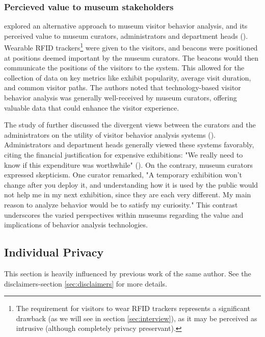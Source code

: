 \subsubsection{Percieved value to museum stakeholders}
\citeauthor{la2017museumbehaviouranalysis} explored an alternative approach to museum visitor behavior analysis, and its perceived value to museum curators, administrators and department heads (\citeyear{la2017museumbehaviouranalysis}). Wearable RFID trackers\footnote{The requirement for visitors to wear RFID trackers represents a significant drawback (as we will see in section \ref{sec:interview}), as it may be perceived as intrusive (although completely privacy preservant).} were given to the visitors, and beacons were positioned at positions deemed important by the museum curators. The beacons would then communicate the positions of the visitors to the system. This allowed for the collection of data on key metrics like exhibit popularity, average visit duration, and common visitor paths. The authors noted that technology-based visitor behavior analysis was generally well-received by museum curators, offering valuable data that could enhance the visitor experience.

The study of \citeauthor{la2017museumbehaviouranalysis} further discussed the divergent views between the curators and the administrators on the utility of visitor behavior analysis systems (\citeyear{la2017museumbehaviouranalysis}). Administrators and department heads generally viewed these systems favorably, citing the financial justification for expensive exhibitions: "We really need to know if this expenditure was worthwhile" (\cite{la2017museumbehaviouranalysis}). On the contrary, museum curators expressed skepticism. One curator remarked, "A temporary exhibition won’t change after you deploy it, and understanding how it is used by the public would not help me in my next exhibition, since they are each very different. My main reason to analyze behavior would be to satisfy my curiosity." This contrast underscores the varied perspectives within museums regarding the value and implications of behavior analysis technologies.

\subsection{Individual Privacy}
\label{sec:individual_privacy}

This section is heavily influenced by previous work of the same author. See the disclaimers-section \ref{sec:disclaimers} for more details.

